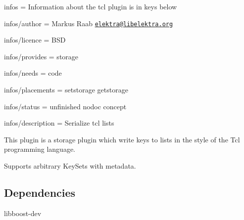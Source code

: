 
\begin{DoxyItemize}
\item infos = Information about the tcl plugin is in keys below
\item infos/author = Markus Raab \href{mailto:elektra@libelektra.org}{\tt elektra@libelektra.\+org}
\item infos/licence = B\+S\+D
\item infos/provides = storage
\item infos/needs = code
\item infos/placements = setstorage getstorage
\item infos/status = unfinished nodoc concept
\item infos/description = Serialize tcl lists
\end{DoxyItemize}

This plugin is a storage plugin which write keys to lists in the style of the Tcl programming language.

Supports arbitrary Key\+Sets with metadata.

\subsection*{Dependencies}


\begin{DoxyItemize}
\item {\ttfamily libboost-\/dev} 
\end{DoxyItemize}